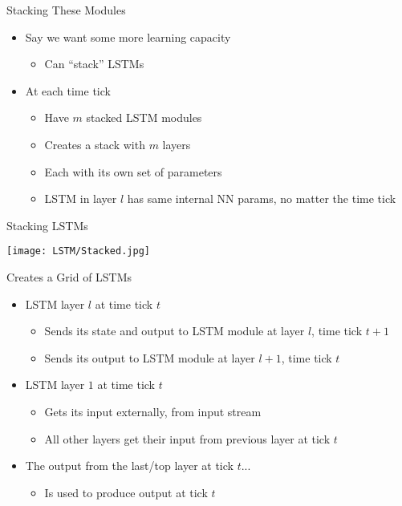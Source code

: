 \documentclass[aspectratio=169]{beamer}
\begin{document}
\begin{frame}{Stacking These Modules}

\begin{itemize}
	\item Say we want some more learning capacity
	\begin{itemize}
                \item Can ``stack'' LSTMs
	\end{itemize}
	\item At each time tick
	\begin{itemize}
		\item Have $m$ stacked LSTM modules
		\item Creates a stack with $m$ layers
		\item Each with its own set of parameters
		\item LSTM in layer $l$ has same internal NN params, no matter the time tick
	\end{itemize}
\end{itemize}
\end{frame}
\begin{frame}{Stacking LSTMs}

\texttt{[image: LSTM/Stacked.jpg]}
\end{frame}
\begin{frame}{Creates a Grid of LSTMs}
\begin{itemize}
	\item LSTM layer $l$ at time tick $t$
	\begin{itemize}
		\item Sends its state and output to LSTM module at layer $l$, time tick $t + 1$
		\item Sends its output to LSTM module at layer $l + 1$, time tick $t$
	\end{itemize}
	\item LSTM layer $1$ at time tick $t$
	\begin{itemize}
		\item Gets its input externally, from input stream
		\item All other layers get their input from previous layer at tick $t$
	\end{itemize}
	\item The output from the last/top layer at tick $t$...
	\begin{itemize}
		\item Is used to produce output at tick $t$
	\end{itemize}
\end{itemize}
\end{frame}
\end{document}
